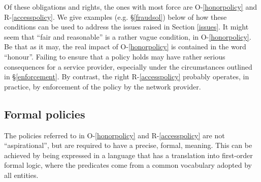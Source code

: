 Of these obligations and rights, the ones with most force are
O-\ref{honorpolicy} and R-\ref{accesspolicy}.  We give examples
(e.g. \S\ref{fraudsol}) below of how these conditions can be used
to address the issues raised in Section \ref{issues}. It might
seem that ``fair and reasonable'' is a rather vague condition,
in O-\ref{honorpolicy}. Be that as it may, the real impact of
O-\ref{honorpolicy} is contained in the word ``honour''. Failing
to ensure that a policy holds may have rather serious consequences
for a service provider, especially under the circumstances outlined
in \S\ref{enforcement}. By contrast, the right R-\ref{accesspolicy}
probably operates, in practice, by enforcement of the policy by the
network provider.

\subsection{Formal policies}\label{formalpolicies}

The policies referred to in O-\ref{honorpolicy} and R-\ref{accesspolicy}
are not ``aspirational'', but are required to have a precise, formal,
meaning. This can be achieved by being expressed in a language that has
a translation into first-order formal logic, where the predicates come
from a common vocabulary adopted by all entities.

\iffalse
\subsection{Possible additions to or excisions from the social contract}

The social contract proposed here, in \S\ref{draft}, is expressed at a
high level, i.e.  it's principle elements are quite abstract and transfer
responsibility for all details to the policies of the participating
entities. This is precisely what we should seek and expect. If a social
construct were to include more specific constraints or rules, this might
unreasonably limit the scope and vision for cyberspace.

Consequently, we should not necessarily expect major opportunities
to improve on the above proposal.  The wording of the obligations and
rights as stated might need improvement. It may be, also, that some of
the obligations might better be removed on the grounds that they are
not technically enforceable, and hence of no real utility.

In particular, it might be argued that obligations O-\ref{noharm} and
O-\ref{nodisinf} should be removed, on the grounds that there is no
clear means to enforce these obligations and in any case, Obligation
O-\ref{honorpolicy} is able to achieve as much as we are entitled to
expect in respect of these objectives.
\fi

